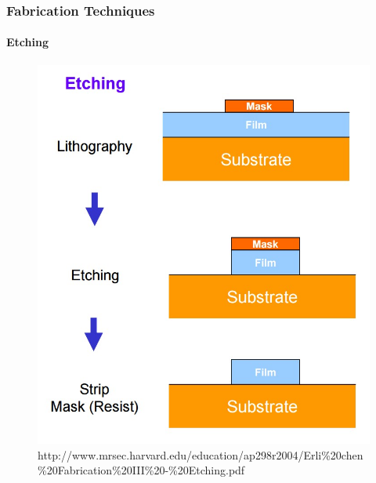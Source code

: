 \documentclass{beamer}
\begin{document}

\begin{frame}
    \frametitle{Fabrication Techniques}
    \framesubtitle{Etching}
    \begin{figure}[ht!]
        \centering
        \includegraphics[height=0.6\textheight]{img/etching.jpg}
        \caption[10pt]{http://www.mrsec.harvard.edu/education/ap298r2004/Erli\%20chen\%20Fabrication\%20III\%20-\%20Etching.pdf}
    \end{figure}
\end{frame}

\end{document}
